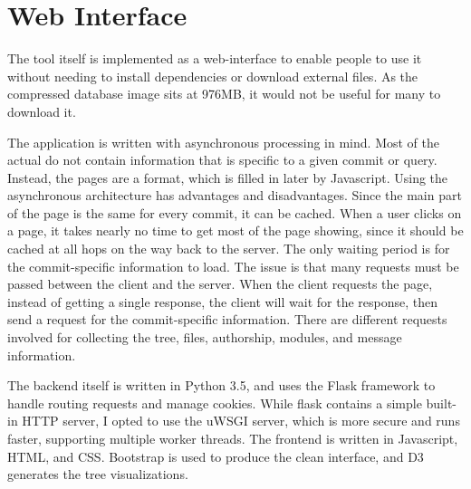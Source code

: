 \section{Web Interface}\label{sec:web_interface}

The tool itself is implemented as a web-interface to enable people to
use it without needing to install dependencies or download external
files. As the compressed database image sits at 976MB, it would not be
useful for many to download it.

The application is written with asynchronous processing in mind. Most of
the actual do not contain information that is specific to a given commit
or query. Instead, the pages are a format, which is filled in later by
Javascript. Using the asynchronous architecture has advantages and
disadvantages. Since the main part of the page is the same for every
commit, it can be cached. When a user clicks on a page, it takes nearly
no time to get most of the page showing, since it should be cached at
all hops on the way back to the server. The only waiting period is for
the commit-specific information to load. The issue is that many requests
must be passed between the client and the server. When the client
requests the page, instead of getting a single response, the client will
wait for the response, then send a request for the commit-specific
information. There are different requests involved for collecting the
tree, files, authorship, modules, and message information.

The backend itself is written in Python 3.5, and uses the Flask
framework to handle routing requests and manage cookies. While flask
contains a simple built-in HTTP server, I opted to use the uWSGI server,
which is more secure and runs faster, supporting multiple worker
threads. The frontend is written in Javascript, HTML, and CSS. Bootstrap
is used to produce the clean interface, and D3 generates the tree
visualizations.
